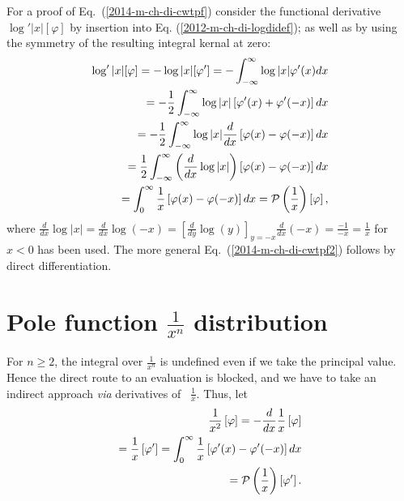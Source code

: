 
{\color{OliveGreen}
\bproof

For a proof of Eq.~(\ref{2014-m-ch-di-cwtpf}) consider the functional derivative
$\log' \vert x\vert [\varphi ]$
by insertion into Eq. (\ref{2012-m-ch-di-logdidef}); as well as by using the symmetry of the resulting integral kernal at zero:
\begin{equation}
\begin{split}
\log' \vert x\vert [\varphi ]
=
- \log \vert x\vert [\varphi ' ]
=
- \int_{-\infty}^\infty  \log \vert x\vert  \varphi '(x) dx
\\
=
- \frac{1}{2} \int_{-\infty}^\infty  \log \vert x\vert  \left[ \varphi '(x)   +\varphi '(- x) \right] dx  \\
=
- \frac{1}{2} \int_{-\infty}^\infty  \log \vert x\vert  \frac{d}{dx}  \left[ \varphi  (x)   -\varphi  (- x) \right] dx
\\
=
  \frac{1}{2} \int_{-\infty}^\infty   \left( \frac{d}{dx} \log \vert x\vert \right) \left[ \varphi  (x)   -\varphi  (- x) \right] dx    \\
=
  \int_{0}^\infty   \frac{1}{x}   \left[ \varphi  (x)   -\varphi  (- x) \right] dx
=
{\cal P} \left(\frac{1}{x}\right) \left[\varphi\right]
,
\end{split}
\end{equation}
where $\frac{d}{dx} \log  \vert x\vert = \frac{d}{dx}\log (- x) = \left[\frac{d}{dy}\log (y) \right]_{y=-x} \frac{d}{dx}(-x) = \frac{-1}{-x} = \frac{1}{x}$
for $x < 0$ has been used.
The more general Eq.~(\ref{2014-m-ch-di-cwtpf2}) follows by direct differentiation.

\eproof
}


\section{Pole function $\frac{1}{x^n}$ distribution}

For $n\ge 2$, the integral over $\frac{1}{x^n}$ is undefined even if we take the principal value.
Hence the direct route to an evaluation is blocked, and we have to take an indirect approach {\it via}
derivatives of~\cite{sommer-di} $\frac{1}{x}$.
Thus, let
\begin{equation}
\begin{split}
\frac{1}{x^2} \left[ \varphi \right]
=
-\frac{d}{dx} \frac{1}{x} \left[ \varphi \right] \\
=\frac{1}{x} \left[ \varphi ' \right] =
\int_0^{\infty}  \frac{1}{x}  \left[  \varphi'(x)
-
   \varphi'(-x) \right] dx
\\
 =
{\cal P} \left(\frac{1}{x}\right) \left[\varphi ' \right]
 .
\end{split}
\label{2013-m-v-di-pfd}
\end{equation}

